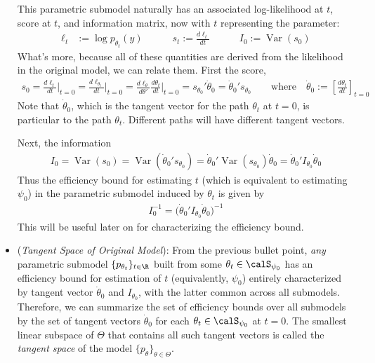 \documentclass[12pt]{article}
\theoremstyle{plain}
\theoremstyle{definition}
\theoremstyle{remark}
\newcommand{\Var}{\operatorname{Var}}
\begin{document}
\begin{itemize}
    This parametric submodel naturally has an associated log-likelihood
    at $t$, score at $t$, and information matrix, now with $t$
    representing the parameter:
    \begin{align*}
      \ell_t
      &:= \log p_{\theta_t}(y)
      \qquad\quad
      s_t
      :=
      \frac{d\ell_t}{dt}
      \qquad\quad
      I_0
      :=
      \Var(s_0)
    \end{align*}
    What's more, because all of these quantities are derived from the
    likelihood in the original model, we can relate them.
    First the score,
    \begin{align*}
      s_0
      =
      \frac{d\ell_t}{dt}
      \bigg|_{t=0}
      =
      \frac{d\ell_{\theta_t}}{dt}
      \bigg|_{t=0}
      =
      \frac{d\ell_{\theta}}{d\theta'}
      \frac{d\theta_t}{dt}
      \bigg|_{t=0}
      =
      s_{\theta_0}'
      \dot{\theta}_0
      =
      \dot{\theta}_0'
      s_{\theta_0}
      \qquad\text{where}\quad
      \dot{\theta}_0
      :=
      \left[
      \frac{d\theta_t}{dt}
      \right]_{t=0}
    \end{align*}
    Note that $\dot{\theta}_0$, which is the tangent vector for the path
    $\theta_t$ at $t=0$, is particular to the path $\theta_t$.
    Different paths will have different tangent vectors.

    Next, the information
    \begin{align*}
      I_0
      =
      \Var(s_0)
      =
      \Var\left(
      \dot{\theta}_0'
      s_{\theta_0}
      \right)
      =
      \dot{\theta}_0'
      \Var\left(
      s_{\theta_0}
      \right)
      \dot{\theta}_0
      =
      \dot{\theta}_0'
      I_{\theta_0}
      \dot{\theta}_0
    \end{align*}
    Thus the efficiency bound for estimating $t$
    (which is equivalent to estimating $\psi_0$)
    in the parametric submodel induced by $\theta_t$ is given by
    \begin{align*}
      I_0^{-1} =
      \big(
      \dot{\theta}_0'
      I_{\theta_0}
      \dot{\theta}_0
      \big)^{-1}
    \end{align*}
    This will be useful later on for characterizing the efficiency
    bound.

  \item
    (\emph{Tangent Space of Original Model}):
    From the previous bullet point,
    \emph{any} parametric submodel $\{p_{\theta_t}\}_{t\in\R}$
    built from some $\theta_t\in\calS_{\psi_0}$
    has an efficiency bound for estimation of $t$ (equivalently,
    $\psi_0$) entirely characterized by tangent vector $\dot{\theta}_0$
    and $I_{\theta_0}$, with the latter common across all submodels.
    Therefore, we can summarize the set of efficiency bounds over all
    submodels by the set of tangent vectors $\dot{\theta}_0$ for each
    $\theta_t\in\calS_{\psi_0}$ at $t=0$.
    The smallest linear subspace of $\Theta$ that contains all such
    tangent vectors is called the \emph{tangent space} of the model
    $\{p_\theta\}_{\theta\in\Theta}$.


\end{itemize}
\end{document}
